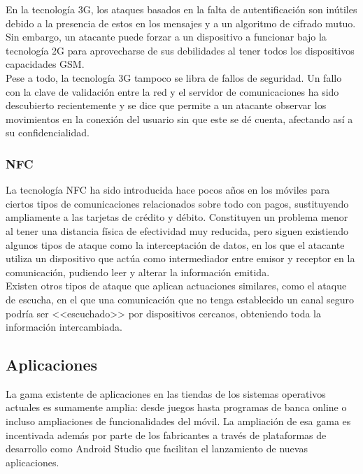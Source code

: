 \documentclass[11pt]{article}
\begin{document}
{En la tecnología 3G, los ataques basados en la falta de autentificación son inútiles debido a la presencia de estos en los mensajes y a un algoritmo de cifrado mutuo. Sin embargo, un atacante puede forzar a un dispositivo a funcionar bajo la tecnología 2G para aprovecharse de sus debilidades al tener todos los dispositivos capacidades GSM.} \\

{Pese a todo, la tecnología 3G tampoco se libra de fallos de seguridad. Un fallo con la clave de validación entre la red y el servidor de comunicaciones ha sido descubierto recientemente y se dice que permite a un atacante observar los movimientos en la conexión del usuario sin que este se dé cuenta, afectando así a su confidencialidad.}

\newpage
\subsubsection{NFC}

{La tecnología NFC ha sido introducida hace pocos años en los móviles para ciertos tipos de comunicaciones relacionados sobre todo con pagos, sustituyendo ampliamente a las tarjetas de crédito y débito. Constituyen un problema menor al tener una distancia física de efectividad muy reducida, pero siguen existiendo algunos tipos de ataque como la interceptación de datos, en los que el atacante utiliza un dispositivo que actúa como intermediador entre emisor y receptor en la comunicación, pudiendo leer y alterar la información emitida.} \\

{Existen otros tipos de ataque que aplican actuaciones similares, como el ataque de escucha, en el que una comunicación que no tenga establecido un canal seguro podría ser <<escuchado>> por dispositivos cercanos, obteniendo toda la información intercambiada.}

\subsection{Aplicaciones}

{La gama existente de aplicaciones en las tiendas de los sistemas operativos actuales es sumamente amplia: desde juegos hasta programas de banca online o incluso ampliaciones de funcionalidades del móvil. La ampliación de esa gama es incentivada además por parte de los fabricantes a través de plataformas de desarrollo como Android Studio que facilitan el lanzamiento de nuevas aplicaciones.} \\
\end{document}
